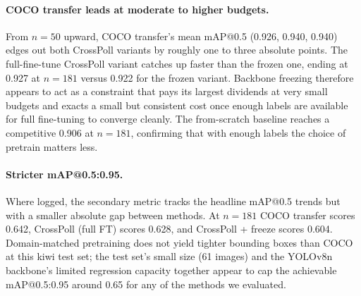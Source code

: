 \paragraph{COCO transfer leads at moderate to higher budgets.} From $n{=}50$ upward, COCO transfer's mean mAP@0.5 (0.926, 0.940, 0.940) edges out both CrossPoll variants by roughly one to three absolute points. The full-fine-tune CrossPoll variant catches up faster than the frozen one, ending at 0.927 at $n{=}181$ versus 0.922 for the frozen variant. Backbone freezing therefore appears to act as a constraint that pays its largest dividends at very small budgets and exacts a small but consistent cost once enough labels are available for full fine-tuning to converge cleanly. The from-scratch baseline reaches a competitive 0.906 at $n{=}181$, confirming that with enough labels the choice of pretrain matters less.

\paragraph{Stricter mAP@0.5{:}0.95.} Where logged, the secondary metric tracks the headline mAP@0.5 trends but with a smaller absolute gap between methods. At $n{=}181$ COCO transfer scores 0.642, CrossPoll (full FT) scores 0.628, and CrossPoll + freeze scores 0.604. Domain-matched pretraining does not yield tighter bounding boxes than COCO at this kiwi test set; the test set's small size (61 images) and the YOLOv8n backbone's limited regression capacity together appear to cap the achievable mAP@0.5{:}0.95 around 0.65 for any of the methods we evaluated.
